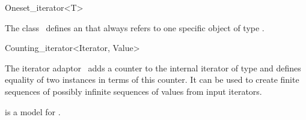 \begin{ccRefClass}{Oneset_iterator<T>}
  \label{sectionOnesetIterator}

  
  \ccDefinition The class \ccClassTemplateName\ defines an
   that always refers to one specific object of
  type .
  

  \ccIsModel
  
  \ccCreation

  
  \ccTagFullDeclarations{}\ccTagDefaults
  
  \ccSeeAlso

\end{ccRefClass}

\begin{ccRefClass}{Counting_iterator<Iterator, Value>}
  \label{sectionCountingIterator}

  
  \ccDefinition The iterator adaptor \ccClassTemplateName\ adds a
  counter to the internal iterator of type  and defines
  equality of two instances in terms of this counter. It can be used
  to create finite sequences of possibly infinite sequences of values
  from input iterators.


  \ccIsModel
  
    is a model for
  .

  \ccCreation

  
  

  \ccSeeAlso

\end{ccRefClass}

